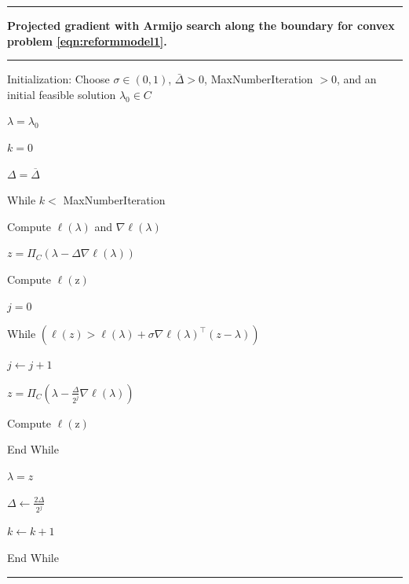 \documentclass[article]{jss}
\begin{document}
\hrule
\vspace*{0.2cm}
\par {\textbf{Projected gradient with Armijo search along the boundary for convex problem \eqref{eqn:reformmodel1}.}}
\vspace*{0.2cm}
\hrule
\vspace*{0.2cm}
\par Initialization: Choose $\sigma \in (0,1)$, $\bar{\Delta} > 0$, MaxNumberIteration $> 0$, and an initial feasible solution $\lambda_{0} \in C$
\par $\lambda = \lambda_{0}$
\par $k = 0$
\par $\Delta = \overline{\Delta}$
\par While $k <$ MaxNumberIteration
\par \hspace*{1cm} Compute $\ell(\lambda)$ and $\nabla \ell(\lambda)$
\par \hspace*{1cm} $\displaystyle z = \Pi_{C}\left(\lambda - \Delta \nabla \ell(\lambda)\right)$
\par \hspace*{1cm} Compute $\ell(\mbox{z})$
\par \hspace*{1cm} $j = 0$
\par \hspace*{1cm} While $\left(\displaystyle \ell(z) > \ell(\lambda) + \sigma \nabla \ell(\lambda)^{\top} (z - \lambda)\right)$
\par \hspace*{2cm} $j \leftarrow j + 1$
\par \hspace*{2cm} $\displaystyle z = \Pi_{C}\left(\lambda - \frac{\Delta}{2^{j}} \nabla \ell(\lambda)\right)$
\par \hspace*{2cm} Compute $\ell(\mbox{z})$
\par \hspace*{1cm} End While
\par \hspace*{1cm} $\lambda = z$
\par \hspace*{1cm} $\displaystyle{\Delta \leftarrow \frac{2 \Delta}{2^{j}}}$
\par \hspace*{1cm} $k \leftarrow k+1$
\par End While
\vspace*{0.2cm}
\hrule
\vspace*{0.2cm}
\end{document}
